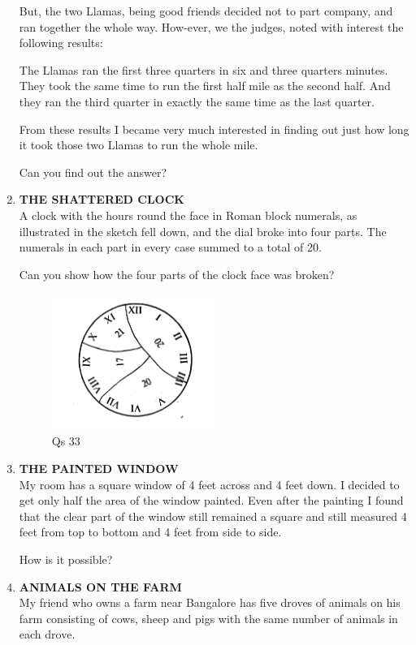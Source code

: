 \documentclass[12pt]{article}
\begin{document}
\begin{enumerate}
But, the two Llamas,  being  good  friends  decided  not to part  company,  and ran together  the whole  way.  How-ever,  we the  judges,  noted  with  interest  the  following results: 

The Llamas  ran  the  first  three  quarters  in six and three  quarters  minutes.  They  took  the  same  time  to run the first half mile  as the second  half.  And  they  ran the third  quarter  in exactly  the  same  time  as the last quarter. 

From  these  results  I became  very  much  interested  in finding  out  just  how  long  it took  those  two  Llamas  to run the whole  mile. 

Can you find  out the answer? 
%
\item \textbf{THE  SHATTERED  CLOCK} \\
A clock  with  the  hours  round  the  face  in Roman block  numerals,  as illustrated  in the sketch fell down,  and  the  dial  broke  into  four  parts.  The numerals  in each  part  in every  case  summed  to a total of 20. 

Can you  show  how  the four  parts  of the  clock  face was broken? 

\begin{figure}[h]
\begin{center}
\includegraphics[width=0.5\textwidth]{sdevi_q33.png}
\caption{ Qs 33}
\end{center}
\end{figure}

%
\item \textbf{THE  PAINTED  WINDOW} \\
My room  has  a square  window  of 4 feet  across  and  4 feet down.  I decided  to get  only  half  the area  of the window  painted.  Even  after  the painting  I found  that the clear  part  of the window  still remained  a square  and still measured  4 feet from  top to bottom  and 4 feet  from side to side. 

How  is it possible? 
%
\item \textbf{ANIMALS  ON  THE  FARM} \\
My friend  who  owns  a farm  near  Bangalore  has  five droves  of animals  on his farm  consisting  of cows,  sheep and pigs  with  the  same  number  of animals  in each drove. 


\end{enumerate}
\end{document}
